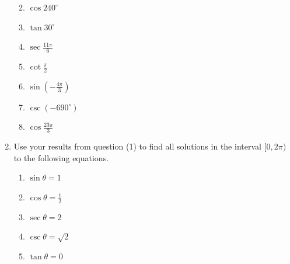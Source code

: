 \documentclass[12pt]{article}
\newif\ifans
\begin{document}
\begin{enumerate}
\begin{enumerate}
\ifans\fbox{$-\frac{1}{\sqrt{2}}$}\fi

\item $\cos{240^\circ}$

\ifans\fbox{$-\frac{1}{2}$}\fi

\item $\tan{30^\circ}$

\ifans\fbox{$\frac{1}{\sqrt{3}}$}\fi

\item $\sec{\frac{11\pi}{6}}$

\ifans\fbox{$\frac{2}{\sqrt{3}}$}\fi

\item $\cot{\frac{\pi}{2}}$

\ifans\fbox{$0$}\fi

\item $\sin{\left(-\frac{4\pi}{3}\right)}$

\ifans\fbox{$\frac{\sqrt{3}}{2}$}\fi

\item $\csc{(-690^\circ)}$

\ifans\fbox{$2$}\fi

\item $\cos{\frac{23\pi}{3}}$

\ifans\fbox{$\frac{1}{2}$}\fi

\end{enumerate}

\item Use your results from question (1) to find all solutions in the interval $[0,2\pi)$ to the following equations.

\begin{enumerate}

\item $\sin{\theta}=1$

\ifans\fbox{$\theta=\frac{\pi}{2}$}\fi

\item $\cos{\theta}=\frac{1}{2}$

\ifans\fbox{$\theta=\frac{\pi}{3}$ or $\theta=\frac{5\pi}{3}$}\fi

\item $\sec{\theta}=2$

\ifans\fbox{$\theta=\frac{\pi}{3}$ or $\theta=\frac{5\pi}{3}$}\fi

\item $\csc{\theta}=\sqrt{2}$

\ifans\fbox{$\theta=\frac{\pi}{4}$ or $\theta=\frac{3\pi}{4}$}\fi

\item $\tan{\theta}=0$


\end{enumerate}
\end{enumerate}
\end{document}
